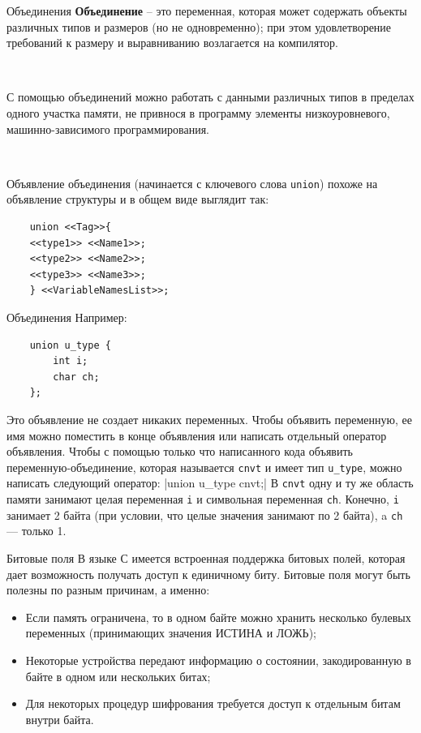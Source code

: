 \documentclass{beamer}
\begin{document}
\begin{frame}[fragile]{Объединения}
    \textbf{Объединение} – это переменная, которая может содержать объекты
    различных типов и размеров (но не одновременно); при этом
    удовлетворение требований к размеру и выравниванию возлагается на
    компилятор. 
    
    ~
    
    С помощью объединений можно работать с данными
    различных типов в пределах одного участка памяти, не привнося в
    программу элементы низкоуровневого, машинно-зависимого
    программирования. 
    
    ~
    
    Объявление объединения (начинается с ключевого слова \texttt{union}) похоже на объявление структуры и в общем виде выглядит так:
    
    \begin{verbatim}
    union <<Tag>>{
    <<type1>> <<Name1>>;
    <<type2>> <<Name2>>;
    <<type3>> <<Name3>>;
    } <<VariableNamesList>>;
    \end{verbatim}
\end{frame}

\begin{frame}[fragile]{Объединения}
    Например:
    \begin{verbatim}
    union u_type {
        int i;
        char ch;
    };
    \end{verbatim}
    \medskip
    Это объявление не создает никаких переменных. Чтобы объявить
    переменную, ее имя можно поместить в конце объявления или написать отдельный оператор объявления.
    \medskip
    Чтобы с помощью только что написанного кода объявить переменную-объединение, которая называется \texttt{cnvt} и имеет тип \texttt{u\_type}, можно написать следующий оператор:
    \medskip
    |union u_type cnvt;|
    \medskip
    В \texttt{cnvt} одну и ту же область памяти занимают целая переменная \texttt{i} и символьная переменная \texttt{ch}. Конечно, \texttt{i} занимает 2 байта (при условии, что целые значения занимают по 2 байта), a \texttt{ch} — только 1.
\end{frame}

\begin{frame}[fragile]{Битовые поля}
    В языке С имеется встроенная поддержка битовых полей, которая дает возможность получать доступ к единичному биту. Битовые поля могут быть полезны по разным причинам, а именно:
    \medskip
    \begin{itemize}
    \item Если память ограничена, то в одном байте можно хранить несколько булевых переменных (принимающих значения ИСТИНА и ЛОЖЬ);
    \item Некоторые устройства передают информацию о состоянии, закодированную в байте в одном или нескольких битах;
    \item Для некоторых процедур шифрования требуется доступ к отдельным битам внутри байта.
    \end{itemize}
    \medskip
\end{frame}
\end{document}
